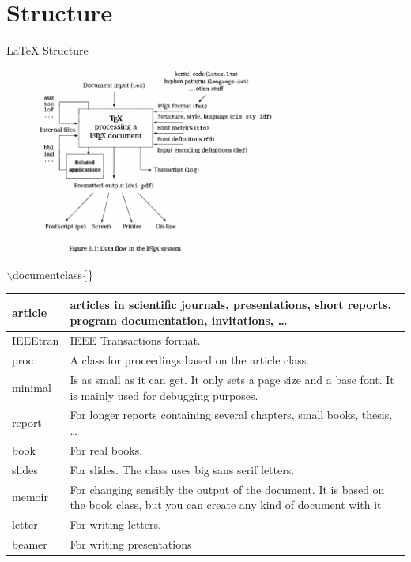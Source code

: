 \documentclass[10pt,times]{beamer}
\begin{document}
\section{Structure}


\begin{frame}{LaTeX Structure}
\begin{figure}
\centering
\includegraphics[width=0.7\textwidth]{figs/LaTeX.png}
\end{figure}
\end{frame}


\begin{frame}{$\backslash$documentclass\{\}}

\begin{table}
\begin{tabular}{|l|p{}|}
\hline
article & articles in scientific journals, presentations, short reports, program documentation, invitations, \dots \\ \hline
IEEEtran & IEEE Transactions format.\\ \hline
proc & A class for proceedings based on the article class.\\ \hline
minimal & Is as small as it can get. It only sets a page size and a base font. It is mainly used for debugging purposes.\\ \hline
report & For longer reports containing several chapters, small books, thesis, \dots \\ \hline
book & For real books.\\ \hline
slides & For slides. The class uses big sans serif letters.\\ \hline
memoir & For changing sensibly the output of the document. It is based on the book class, but you can create any kind of document with it\\ \hline
letter & For writing letters. \\ \hline
beamer& For writing presentations \\ \hline
\end{tabular}
\end{table}
\end{frame}
\end{document}
